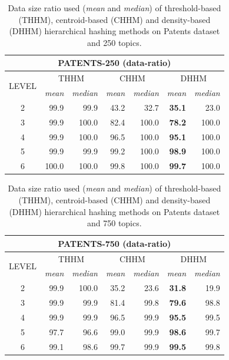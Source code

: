 \begin{table}\centering
  \scriptsize
  \begin{tabular}{c|rr||rr||rr}
    \multicolumn{7}{c}{PATENTS-250 (data-ratio)} \\
    \toprule
    \multirow{2}{*}{LEVEL} &
      \multicolumn{2}{c}{THHM} &
      \multicolumn{2}{c}{CHHM} &
      \multicolumn{2}{c}{DHHM} \\
      & {\textit{mean}} & {\textit{median}} & {\textit{mean}} & {\textit{median}} & {\textit{mean}} & {\textit{median}} \\
      \midrule
    2 & 99.9 & 99.9   & 43.2 & 32.7  & \textbf{35.1} & 23.0 \\
    3 & 99.9 & 100.0  & 82.4 & 100.0 & \textbf{78.2} & 100.0 \\
    4 & 99.9 & 100.0  & 96.5 & 100.0 & \textbf{95.1} & 100.0 \\
    5 & 99.9 & 99.9   & 99.2 & 100.0 & \textbf{98.9} & 100.0 \\
    6 & 100.0 & 100.0 & 99.8 & 100.0 & \textbf{99.7} & 100.0 \\
    \bottomrule
  \end{tabular}
\caption{Data size ratio used (\textit{mean} and \textit{median}) of threshold-based (THHM), centroid-based (CHHM) and density-based (DHHM) hierarchical hashing methods on Patents dataset and 250 topics.}
\label{tb:patents250-d}
\end{table}

\begin{table}\centering
  \scriptsize
  \begin{tabular}{c|rr||rr||rr}
    \multicolumn{7}{c}{PATENTS-750 (data-ratio)} \\
    \toprule
    \multirow{2}{*}{LEVEL} &
      \multicolumn{2}{c}{THHM} &
      \multicolumn{2}{c}{CHHM} &
      \multicolumn{2}{c}{DHHM} \\
      & {\textit{mean}} & {\textit{median}} & {\textit{mean}} & {\textit{median}} & {\textit{mean}} & {\textit{median}} \\
      \midrule
    2 & 99.9 & 100.0 & 35.2 & 23.6 & \textbf{31.8} & 19.9 \\
    3 & 99.9 & 99.9  & 81.4 & 99.8 & \textbf{79.6} & 98.8 \\
    4 & 99.9 & 99.9  & 96.5 & 99.9 & \textbf{95.5} & 99.5 \\
    5 & 97.7 & 96.6  & 99.0 & 99.9 & \textbf{98.6} & 99.7 \\
    6 & 99.1 & 98.6  & 99.7 & 99.9 & \textbf{99.5} & 99.8 \\
    \bottomrule
  \end{tabular}
\caption{Data size ratio used (\textit{mean} and \textit{median}) of threshold-based (THHM), centroid-based (CHHM) and density-based (DHHM) hierarchical hashing methods on Patents dataset and 750 topics.}
\label{tb:patents750-d}
\end{table}

